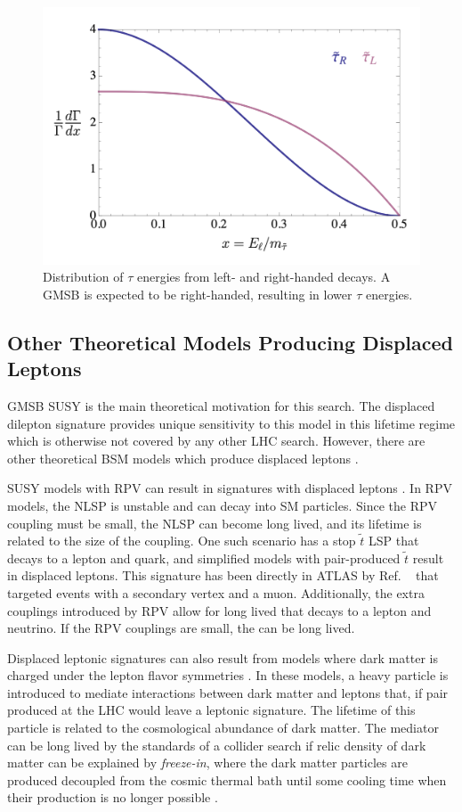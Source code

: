 \begin{figure}[!h]
\centering
\includegraphics[width=.7\textwidth]{figures/theory/tau-pt.png}
\caption{Distribution of $\tau$ energies from left- and right-handed \stau decays. A \ac{GMSB} \stau is expected to be right-handed, resulting in lower $\tau$ energies. \cite{jesseshelton}}
\label{fig:taupt}
\end{figure}

\subsection{Other Theoretical Models Producing Displaced Leptons}
\label{sec:othermodels}

\ac{GMSB} \ac{SUSY} is the main theoretical motivation for this search. The displaced dilepton signature provides unique sensitivity to this model in this lifetime regime which is otherwise not covered by any other \ac{LHC} search. However, there are other theoretical \ac{BSM} models which produce displaced leptons \cite{jesseshelton}.

\ac{SUSY} models with \acf{RPV} can result in signatures with displaced leptons \cite{Barbier_2005}. In \ac{RPV} models, the \ac{NLSP} is unstable and can decay into \ac{SM} particles. Since the \ac{RPV} coupling must be small, the \ac{NLSP} can become long lived, and its lifetime is related to the size of the coupling. One such scenario has a stop $\tilde{t}$ \ac{LSP} that decays to a lepton and quark, and simplified models with pair-produced $\tilde{t}$ result in displaced leptons. This signature has been directly in \ac{ATLAS} by Ref. ~\cite{dvplusmu} that targeted events with a secondary vertex and a muon. Additionally, the extra couplings introduced by RPV allow for long lived \stau that decays to a lepton and neutrino. If the RPV couplings are small, the \stau can be long lived.

Displaced leptonic signatures can also result from models where dark matter is charged under the lepton flavor symmetries \cite{Agrawal_2012}. In these models, a heavy particle is introduced to mediate interactions between dark matter and leptons that, if pair produced at the \ac{LHC} would leave a leptonic signature. The lifetime of this particle is related to the cosmological abundance of dark matter. The mediator can be long lived by the standards of a collider search if relic density of dark matter can be explained by \emph{freeze-in}, where the dark matter particles are produced decoupled from the cosmic thermal bath until some cooling time when their production is no longer possible \cite{Hall_2010}.




